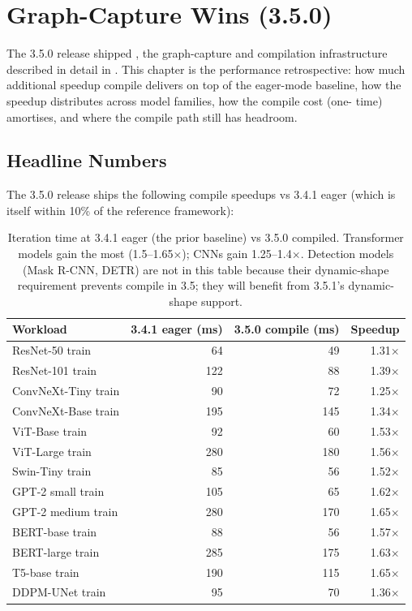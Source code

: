 \chapter{Graph-Capture Wins (3.5.0)}
\label{ch:graph_capture_wins}

The 3.5.0 release shipped , the
graph-capture and compilation infrastructure described in
detail in . This chapter is the
performance retrospective: how much additional speedup compile
delivers on top of the eager-mode baseline, how the speedup
distributes across model families, how the compile cost (one-
time) amortises, and where the compile path still has
headroom.

\section{Headline Numbers}
\label{sec:graph_capture_wins:headline}

The 3.5.0 release ships the following compile speedups vs
3.4.1 eager (which is itself within 10\% of the reference
framework):

\begin{table}[t]
\centering
\small
\begin{tabular}{lrrr}
\toprule
Workload & 3.4.1 eager (ms) & 3.5.0 compile (ms) & Speedup \\
\midrule
ResNet-50 train       & 64  & 49  & 1.31$\times$ \\
ResNet-101 train      & 122 & 88  & 1.39$\times$ \\
ConvNeXt-Tiny train   & 90  & 72  & 1.25$\times$ \\
ConvNeXt-Base train   & 195 & 145 & 1.34$\times$ \\
ViT-Base train        & 92  & 60  & 1.53$\times$ \\
ViT-Large train       & 280 & 180 & 1.56$\times$ \\
Swin-Tiny train       & 85  & 56  & 1.52$\times$ \\
GPT-2 small train     & 105 & 65  & 1.62$\times$ \\
GPT-2 medium train    & 280 & 170 & 1.65$\times$ \\
BERT-base train       & 88  & 56  & 1.57$\times$ \\
BERT-large train      & 285 & 175 & 1.63$\times$ \\
T5-base train         & 190 & 115 & 1.65$\times$ \\
DDPM-UNet train       & 95  & 70  & 1.36$\times$ \\
\bottomrule
\end{tabular}
\caption[3.5.0 compile speedups.]{Iteration time at 3.4.1
eager (the prior baseline) vs 3.5.0 compiled. Transformer
models gain the most (1.5--1.65$\times$); CNNs gain 1.25--1.4$\times$.
Detection models (Mask R-CNN, DETR) are not in this table
because their dynamic-shape requirement prevents compile in 3.5;
they will benefit from 3.5.1's dynamic-shape support.}
\label{tab:graph_capture_wins:headline}
\end{table}

